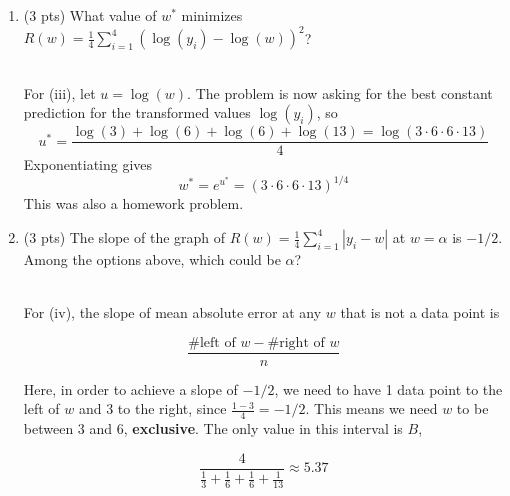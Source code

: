 \documentclass[11pt]{article}
\begin{document}
\begin{prob}
\begin{enumerate}[label=(\roman*)]
\begin{solution}
For (ii), as $p \to \infty$, the largest value of $|y_i-w|$ dominates. So we should put $w$ halfway between the smallest and largest data values, as discussed in \href{https://notes.eecs245.org/introduction-to-supervised-learning/comparing-loss-functions/\#beyond-absolute-and-squared-loss}{Chapter 1.4}.
\[
w^* = \frac{3+13}{2} = \boxed{8}
\]
\end{solution}

\item (3 pts) What value of $w^*$ minimizes $R(w) = \displaystyle \frac{1}{4} \sum_{i=1}^4 (\log(y_i) - \log(w))^2$? \\
        \\

\begin{solution}
For (iii), let $u=\log(w)$. The problem is now asking for the best constant prediction for the transformed values $\log(y_i)$, so
\[
u^* = \frac{\log(3)+\log(6)+\log(6)+\log(13) = \log(3 \cdot 6 \cdot 6 \cdot 13)}{4}
\]
Exponentiating gives
\[
w^* = e^{u^*} = \boxed{(3 \cdot 6 \cdot 6 \cdot 13)^{1/4}}
\]
This was also a homework problem.
\end{solution}

\item (3 pts) The slope of the graph of $R(w) = \displaystyle\frac{1}{4} \sum_{i = 1}^4 |y_i - w|$ at $w = \alpha$ is $-1/2$. Among the options above, which could be $\alpha$? \\

        \\
\begin{solution}
For (iv), the slope of mean absolute error at any $w$ that is not a data point is

$$\frac{\text{\# left of } w - \text{\# right of } w}{n}$$

Here, in order to achieve a slope of $-1/2$, we need to have 1 data point to the left of $w$ and 3 to the right, since $\frac{1-3}{4} = -1/2$. This means we need $w$ to be between $3$ and $6$, \textbf{exclusive}. The only value in this interval is $B$,

\[
\boxed{\dfrac{4}{\frac{1}{3}+\frac{1}{6}+\frac{1}{6}+\frac{1}{13}} \approx 5.37}
\]

\end{solution}
\end{enumerate}    


\end{prob}
\end{document}
